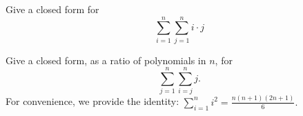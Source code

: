 \documentclass[12pt]{article}
\begin{document}
%
%

\begin{problem}{13}
    \bparts
%

        
         Give a closed form for
        \begin{equation*}
            \sum_{i=1}^n \sum_{j=1}^n i \cdot j
        \end{equation*}

        \solution[\vspace{3in}]{
            \begin{align*}
                \sum_{i=1}^n \sum_{j=1}^n i \cdot j &= \sum_{i=1}^n (i \cdot \sum_{j=1}^n j) \\
                                                    &= \sum_{i=1}^n i \cdot \frac{n(n+1)}{2} \\
                                                    &= \frac{n(n+1)}{2} \cdot \sum_{i=1}^n i \\
                                                    &= \left( \frac{n (n+1)}{2} \right)^2.
            \end{align*}
        }

        Give a closed form, as a ratio of polynomials in $n$, for
        $$ \sum_{j=1}^n \sum_{i=j}^n j. $$
        For convenience, we provide the identity:
        $\displaystyle \sum_{i=1}^n i^2 = \frac{n(n+1)(2n+1)}{6}. $


\end{problem}
\end{document}
